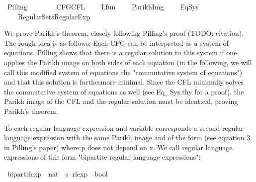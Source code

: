 %
\begin{isabellebody}%
%
%
\isadelimtheory
%
\endisadelimtheory
%
\isatagtheory
{}\isamarkupfalse%
\ Pilling\isanewline
\ \ \ \isanewline
\ \ \ \ {\isachardoublequoteopen}CFG{\isachardot}{\kern0pt}CFL{\isachardoublequoteclose}\isanewline
\ \ \ \ {\isachardoublequoteopen}Lfun{\isachardoublequoteclose}\isanewline
\ \ \ \ {\isachardoublequoteopen}Parikh{\isacharunderscore}{\kern0pt}Img{\isachardoublequoteclose}\isanewline
\ \ \ \ {\isachardoublequoteopen}Eq{\isacharunderscore}{\kern0pt}Sys{\isachardoublequoteclose}\isanewline
\ \ \ \ {\isachardoublequoteopen}Regular{\isacharminus}{\kern0pt}Sets{\isachardot}{\kern0pt}Regular{\isacharunderscore}{\kern0pt}Exp{\isachardoublequoteclose}\isanewline
{}%
\endisatagtheory
{\isafoldtheory}%
%
\isadelimtheory
%
\endisadelimtheory
%
\begin{isamarkuptext}%
We prove Parikh's theorem, closely following Pilling's proof (TODO: citation). The rough
idea is as follows: Each CFG can be interpreted as a system of equations. Pilling shows that
there is a regular solution to this system if one applies the Parikh image on both sides of each
equation (in the following, we will call this modified system of equations the "commutative system
of equations") and that this solution is furthermore minimal. Since the CFL minimally solves
the commutative system of equations as well (see Eq_Sys.thy for a proof), the Parikh image of the
CFL and the regular solution must be identical, proving Parikh's theorem.%
\end{isamarkuptext}\isamarkuptrue%
%
\isadelimdocument
%
\endisadelimdocument
%
\isatagdocument
%
\isamarkuptrue%
%
\endisatagdocument
{\isafolddocument}%
%
\isadelimdocument
%
\endisadelimdocument
%
\begin{isamarkuptext}%
To each regular language expression and variable  corresponds a second regular language
expression with the same Parikh image and of the form  (see equation 3 in Pilling's paper)
where p does not depend on x. We call regular language expressions of this form "bipartite regular
language expressions":%
\end{isamarkuptext}\isamarkuptrue%
\isamarkupfalse%
\ bipart{\isacharunderscore}{\kern0pt}rlexp\ {\isacharcolon}{\kern0pt}{\isacharcolon}{\kern0pt}\ {\isachardoublequoteopen}nat\ {\isasymRightarrow}\ {\isacharprime}{\kern0pt}a\ rlexp\ {\isasymRightarrow}\ bool{\isachardoublequoteclose}\ \isanewline

\end{isabellebody}
